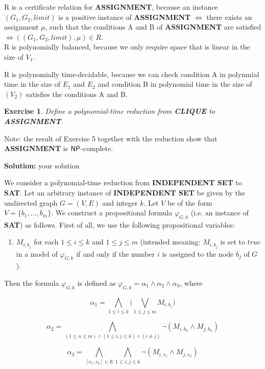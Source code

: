 \documentclass [10pt]{article}
\newcommand{\true}{true}
\newtheorem{exercise}[theorem]{Exercise}
\renewcommand{\phi}{\varphi}
\newcommand{\ccfont}[1]{\protect\mathsf{#1}}
\newcommand{\NP}{\ccfont{NP}}
\begin{document}
R is a certificate relation for \textbf{ASSIGNMENT}, because an instance $(G_1, G_2, limit)$ is a positive instance of \textbf{ASSIGNMENT} $\Leftrightarrow$ there exists an assignment $\mu$, such that the conditions A and B of \textbf{ASSIGNMENT} are satisfied  $ \Leftrightarrow ((G_1, G_2, limit), \mu) \in R$.\\

R is polynomially balanced, because we only require space that is linear in the size of $V_1$.

R is polynomially time-decidable, because we can check condition A in polynmial time in the size of $E_1$ and $E_2$ and condition B in polynomial time in the size of $(V_2)$ satisfies the conditions A and B.


\begin{exercise}
    Define a polynomial-time reduction from \textbf{CLIQUE} to
    \textbf{ASSIGNMENT}.
\end{exercise}
Note: the result of Exercise 5 together with the reduction show that
\textbf{ASSIGNMENT} is $\NP$-complete.

\medskip

\textbf{Solution:} your solution

\medskip
    We consider a polynomial-time reduction from \textbf{INDEPENDENT SET} to
    \textbf{SAT}.  Let an arbitrary instance of \textbf{INDEPENDENT SET} be
    given by the undirected graph $G=(V,E)$ and integer $k$. Let $V$ be of the
    form $V=\{b_1,\ldots,b_m\}$.  We construct a propositional formula
    $\phi_{G,k}$ (i.e. an instance of \textbf{SAT}) as follows.
First of all, we use the following propositional variables:
\begin{enumerate}[-]
\item $M_{i,b_j}$ for each $1 \leq i \leq k$ and $ 1 \leq j \leq m$
(intended meaning: $M_{i,b_j}$ is set to $\true$ in a model of $\phi_{G,k}$ if and only if the number $i$ is
    assigned to the node $b_j$ of $G$).
  \end{enumerate} 

 Then the formula $\phi_{G,k}$ is defined as $\phi_{G,k}=
  \alpha_1\land \alpha_2 \land \alpha_3 $, where

\[\alpha_1=\bigwedge_{1 \leq i \leq k} \big ( \bigvee_{1 \leq j \leq m}
    M_{i,b_j} \big )\]

    \[\alpha_2=\bigwedge
    \limits_{ (1 \leq n \leq m) \wedge (1 \leq i,j \leq k)\wedge (i\neq j) }
    \neg (M_{i,b_n} \land M_{j,b_n})\]

  \[\alpha_3=\bigwedge_{[v_1,v_2] \in E } \bigwedge_{ 1 \leq i,j \leq k } \neg(
  M_{i,v_1}\land M_{j,v_2} ) \]
\end{document}
